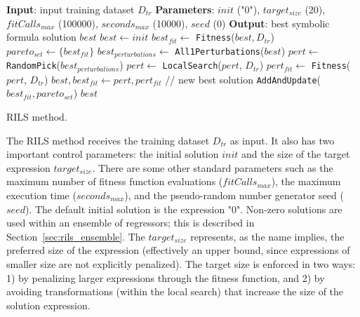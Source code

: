 \documentclass{article}
\begin{document}
\begin{algorithm}
	\footnotesize
\begin{algorithmic}[1] 
\Statex	  \textbf{Input}: input training dataset $D_{tr}$  
\Statex \textbf{Parameters}: $init$ ("0"), $target_{size}$ (20), $fitCalls_{max}$ (100000), $seconds_{max}$ (10000), $seed$ (0)
    \Statex \textbf{Output}: best symbolic formula solution $best$
    \State $best \gets init$ 
    \State $best_{fit} \gets$ \texttt{Fitness}($best, D_{tr}$)
        \State $pareto_{set} \gets \{ best_{fit} \}$
    \State $best_{perturbations} \gets $ \texttt{All1Perturbations}($best$) \label{line:sPert}
        \State $pert \gets $ \texttt{RandomPick}($best_{perturbations}$) \label{line:pickPert}
       \State $pert \gets $ \texttt{LocalSearch}($pert$, $D_{tr}$) \label{line:ls}
    \State $pert_{fit} \gets$ \texttt{Fitness}($pert$, $D_{tr}$)
     \label{line:avoid1}
    \State $best, best_{fit} \gets pert, pert_{fit}$ // new best solution
        \State \texttt{AddAndUpdate}($best_{fit}, pareto_{set}$)
    \EndIf \label{line:avoid2}
    \EndWhile
    \State \Return $best$
\end{algorithmic}
\caption{RILS method.}
\end{algorithm}

The \textsc{RILS} method receives the training dataset $D_{tr}$ as input. It also has two important control parameters: the initial solution $init$ and the size of the target expression $target_{size}$. There are some other standard parameters such as the maximum number of fitness function evaluations ($fitCalls_{max}$), the maximum execution time ($seconds_{max}$), and the pseudo-random number generator seed ($seed$). The default initial solution is the expression "0". Non-zero solutions are used within an ensemble of regressors; this is described in Section~\ref{sec:rils_ensemble}. The $target_{size}$ represents, as the name implies, the preferred size of the expression (effectively an upper bound, since expressions of smaller size are not explicitly penalized). The target size is enforced in two ways: 1) by penalizing larger expressions through the fitness function, and 2) by avoiding transformations (within the local search) that increase the size of the solution expression.
\end{document}
